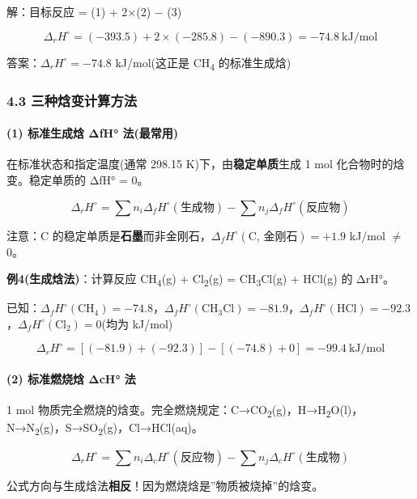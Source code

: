解：目标反应 = (1) + 2×(2) − (3)

\[\Delta_r H^\circ = (-393.5) + 2 \times (-285.8) - (-890.3) = -74.8\ \mathrm{kJ/mol}\]

答案：\(\Delta_r H^\circ = -74.8\) kJ/mol(这正是 CH\textsubscript{4} 的标准生成焓)

\subsubsection{4.3 三种焓变计算方法}\label{ux4e09ux79cdux7113ux53d8ux8ba1ux7b97ux65b9ux6cd5}

\paragraph{(1) 标准生成焓 ΔfH° 法(最常用)}\label{ux6807ux51c6ux751fux6210ux7113-ux3b4fh-ux6cd5ux6700ux5e38ux7528}

在标准状态和指定温度(通常 298.15 K)下，由\textbf{稳定单质}生成 1 mol 化合物时的焓变。稳定单质的 ΔfH° = 0。

\[
\boxed{\Delta_r H^\circ = \sum n_i \Delta_f H^\circ(\text{生成物}) - \sum n_j \Delta_f H^\circ(\text{反应物})}
\]

注意：C 的稳定单质是\textbf{石墨}而非金刚石，\(\Delta_f H^\circ(\text{C, 金刚石}) = +1.9\) kJ/mol \(\neq\) 0。

\textbf{例4(生成焓法)}：计算反应 CH\textsubscript{4}(g) + Cl\textsubscript{2}(g) = CH\textsubscript{3}Cl(g) + HCl(g) 的 ΔrH°。

已知：\(\Delta_f H^\circ(\text{CH}_4) = -74.8\)，\(\Delta_f H^\circ(\text{CH}_3\text{Cl}) = -81.9\)，\(\Delta_f H^\circ(\text{HCl}) = -92.3\)，\(\Delta_f H^\circ(\text{Cl}_2) = 0\)(均为 kJ/mol)

\[\Delta_r H^\circ = [(-81.9) + (-92.3)] - [(-74.8) + 0] = -99.4\ \mathrm{kJ/mol}\]

\paragraph{(2) 标准燃烧焓 ΔcH° 法}\label{ux6807ux51c6ux71c3ux70e7ux7113-ux3b4ch-ux6cd5}

1 mol 物质完全燃烧的焓变。完全燃烧规定：C→CO\textsubscript{2}(g)，H→H\textsubscript{2}O(l)，N→N\textsubscript{2}(g)，S→SO\textsubscript{2}(g)，Cl→HCl(aq)。

\[
\Delta_r H^\circ = \sum n_i \Delta_c H^\circ(\text{反应物}) - \sum n_j \Delta_c H^\circ(\text{生成物})
\]

公式方向与生成焓法\textbf{相反}！因为燃烧焓是''物质被烧掉''的焓变。

